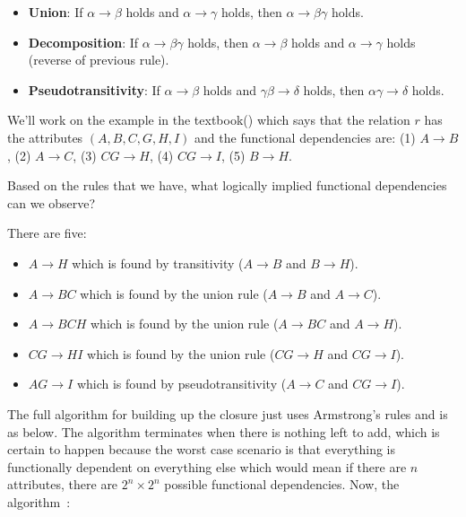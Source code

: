 \begin{itemize}
	\item \textbf{Union}: If $\alpha \rightarrow \beta$ holds and $\alpha \rightarrow \gamma$ holds, then $\alpha \rightarrow \beta\gamma$ holds.
	\item \textbf{Decomposition}: If $\alpha \rightarrow \beta\gamma$ holds, then  $\alpha \rightarrow \beta$ holds and $\alpha \rightarrow \gamma$ holds (reverse of previous rule).
	\item \textbf{Pseudotransitivity}: If $\alpha \rightarrow \beta$ holds and $\gamma\beta \rightarrow \delta$ holds, then $\alpha\gamma \rightarrow \delta$ holds.
\end{itemize}

We'll work on the example in the textbook(\cite{dsc}) which says that the relation $r$ has the attributes $(A, B, C, G, H, I)$ and the functional dependencies are: (1) $A \rightarrow B$, (2) $A \rightarrow C$, (3) $CG \rightarrow H$, (4) $CG \rightarrow I$, (5) $B \rightarrow H$.

Based on the rules that we have, what logically implied functional dependencies can we observe? 

There are five:
\begin{itemize}
	\item $A \rightarrow H$ which is found by transitivity ($A \rightarrow B$ and $B \rightarrow H$).
	\item $A \rightarrow BC$ which is found by the union rule ($A \rightarrow B$ and $A \rightarrow C$).
	\item $A \rightarrow BCH$ which is found by the union rule ($A \rightarrow BC$ and $A \rightarrow H$).
	\item $CG \rightarrow HI$ which is found by the union rule ($CG \rightarrow H$ and $CG \rightarrow I$).
	\item $AG \rightarrow I$ which is found by pseudotransitivity ($A \rightarrow C$ and $CG \rightarrow I$).
\end{itemize}


The full algorithm for building up the closure just uses Armstrong's rules and is as below. The algorithm terminates when there is nothing left to add, which is certain to happen because the worst case scenario is that everything is functionally dependent on everything else which would mean if there are $n$ attributes, there are $2^{n} \times 2^{n}$ possible functional dependencies. Now, the algorithm~\cite{dsc}:

